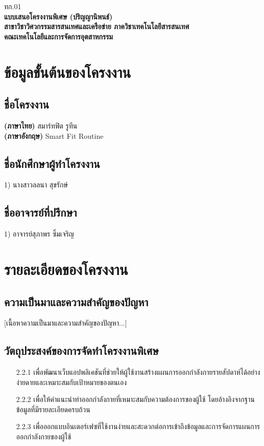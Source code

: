 \documentclass[12pt,a4paper]{article}
\newcommand{\textlight}[1]{{\thailightfont #1}}
\begin{document}
\begin{center}
\hfill\textlight{ทก.01}\\[1cm]

\Large\textbf{แบบเสนอโครงงานพิเศษ (ปริญญานิพนธ์)}\\[0.5cm]
\textbf{สาขาวิชาวิศวกรรมสารสนเทศและเครือข่าย ภาควิชาเทคโนโลยีสารสนเทศ}\\
\textbf{คณะเทคโนโลยีและการจัดการอุตสาหกรรม}
\end{center}

\thispagestyle{empty}
\vspace{2cm}

\section{ข้อมูลขั้นต้นของโครงงาน}

\subsection{ชื่อโครงงาน}
\textbf{(ภาษาไทย)} สมาร์ทฟิต รูทีน\\
\textbf{(ภาษาอังกฤษ)} Smart Fit Routine

\subsection{ชื่อนักศึกษาผู้ทำโครงงาน}
1) นางสาวลลนา สุขรักษ์

\subsection{ชื่ออาจารย์ที่ปรึกษา}
1) อาจารย์สุภาพร ซิ้มเจริญ

\section{รายละเอียดของโครงงาน}

\subsection{ความเป็นมาและความสำคัญของปัญหา}
[เนื้อหาความเป็นมาและความสำคัญของปัญหา...]

\subsection{วัตถุประสงค์ของการจัดทำโครงงานพิเศษ}
\begin{enumerate}
    \item[2.2.1] เพื่อพัฒนาเว็บแอปพลิเคชันที่ช่วยให้ผู้ใช้งานสร้างแผนการออกกำลังกายรายสัปดาห์ได้อย่างง่ายดายและเหมาะสมกับเป้าหมายของตนเอง
    \item[2.2.2] เพื่อให้คำแนะนำท่าออกกำลังกายที่เหมาะสมกับความต้องการของผู้ใช้ โดยอ้างอิงจากฐานข้อมูลที่มีรายละเอียดครบถ้วน
    \item[2.2.3] เพื่อออกแบบอินเตอร์เฟซที่ใช้งานง่ายและสะดวกต่อการเข้าถึงข้อมูลและการจัดการแผนการออกกำลังกายของผู้ใช้
\end{enumerate}
\end{document}
